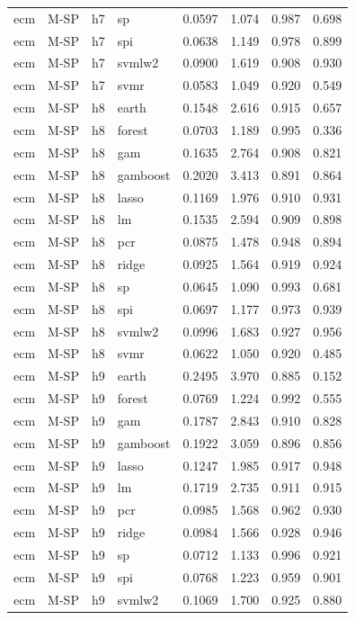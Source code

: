 \begin{ThreePartTable}
\begin{longtable}[t]{llclcccc}
ecm & M-SP & h7 & sp & 0.0597 & 1.074 & 0.987 & 0.698\\
ecm & M-SP & h7 & spi & 0.0638 & 1.149 & 0.978 & 0.899\\
ecm & M-SP & h7 & svmlw2 & 0.0900 & 1.619 & 0.908 & 0.930\\
ecm & M-SP & h7 & svmr & 0.0583 & 1.049 & 0.920 & 0.549\\
\addlinespace
ecm & M-SP & h8 & earth & 0.1548 & 2.616 & 0.915 & 0.657\\
ecm & M-SP & h8 & forest & 0.0703 & 1.189 & 0.995 & 0.336\\
ecm & M-SP & h8 & gam & 0.1635 & 2.764 & 0.908 & 0.821\\
ecm & M-SP & h8 & gamboost & 0.2020 & 3.413 & 0.891 & 0.864\\
ecm & M-SP & h8 & lasso & 0.1169 & 1.976 & 0.910 & 0.931\\
ecm & M-SP & h8 & lm & 0.1535 & 2.594 & 0.909 & 0.898\\
ecm & M-SP & h8 & pcr & 0.0875 & 1.478 & 0.948 & 0.894\\
ecm & M-SP & h8 & ridge & 0.0925 & 1.564 & 0.919 & 0.924\\
ecm & M-SP & h8 & sp & 0.0645 & 1.090 & 0.993 & 0.681\\
ecm & M-SP & h8 & spi & 0.0697 & 1.177 & 0.973 & 0.939\\
ecm & M-SP & h8 & svmlw2 & 0.0996 & 1.683 & 0.927 & 0.956\\
ecm & M-SP & h8 & svmr & 0.0622 & 1.050 & 0.920 & 0.485\\
\addlinespace
ecm & M-SP & h9 & earth & 0.2495 & 3.970 & 0.885 & 0.152\\
ecm & M-SP & h9 & forest & 0.0769 & 1.224 & 0.992 & 0.555\\
ecm & M-SP & h9 & gam & 0.1787 & 2.843 & 0.910 & 0.828\\
ecm & M-SP & h9 & gamboost & 0.1922 & 3.059 & 0.896 & 0.856\\
ecm & M-SP & h9 & lasso & 0.1247 & 1.985 & 0.917 & 0.948\\
ecm & M-SP & h9 & lm & 0.1719 & 2.735 & 0.911 & 0.915\\
ecm & M-SP & h9 & pcr & 0.0985 & 1.568 & 0.962 & 0.930\\
ecm & M-SP & h9 & ridge & 0.0984 & 1.566 & 0.928 & 0.946\\
ecm & M-SP & h9 & sp & 0.0712 & 1.133 & 0.996 & 0.921\\
ecm & M-SP & h9 & spi & 0.0768 & 1.223 & 0.959 & 0.901\\
ecm & M-SP & h9 & svmlw2 & 0.1069 & 1.700 & 0.925 & 0.880\\

\end{longtable}
\end{ThreePartTable}
